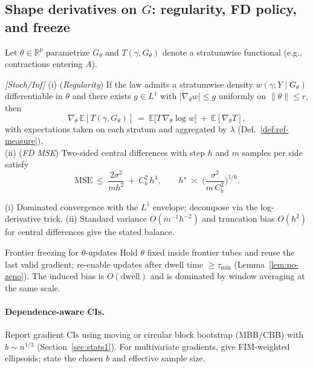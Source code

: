 \subsection{Shape derivatives on $G$: regularity, FD policy, and freeze}\label{subsec:shape}

Let $\theta\in\mathbb R^p$ parametrize $G_\theta$ and $T(\gamma,G_\theta)$ denote a stratumwise functional (e.g., contractions entering $A$).

\begin{proposition}\label{prop:score-fd-7}
\emph{[\textup{Stoch/Inf}]}
(i) (\emph{Regularity}) If the law admits a stratumwise density $w(\gamma;Y\!\mid G_\theta)$ differentiable in $\theta$ and there exists $g\in L^1$ with $|\nabla_\theta w|\le g$ uniformly on $\|\theta\|\le r$, then
\[
\nabla_\theta\,\mathbb E[T(\gamma,G_\theta)]
\ =\ \mathbb E\big[T\,\nabla_\theta\log w\big]\ +\ \mathbb E[\nabla_\theta T],
\]
with expectations taken on each stratum and aggregated by $\lambda$ (Def.~\ref{def:ref-measure}).\\
(ii) (\emph{FD MSE}) Two-sided central differences with step $h$ and $m$ samples per side satisfy
\[
\mathrm{MSE}\ \le\ \frac{2\sigma^2}{m h^2}\ +\ C_b^2\,h^4,\qquad 
h^\star\ \asymp\ \Big(\frac{\sigma^2}{m\,C_b^2}\Big)^{\!1/6}.
\]
\begin{proofsketch}
(i) Dominated convergence with the $L^1$ envelope; decompose via the log-derivative trick. (ii) Standard variance $O(m^{-1}h^{-2})$ and truncation bias $O(h^2)$ for central differences give the stated balance.
\end{proofsketch}
\end{proposition}

\begin{rulex}{Frontier freezing for $\theta$-updates}
Hold $\theta$ fixed inside frontier tubes and reuse the last valid gradient; re-enable updates after dwell time $\ge \tau_{\min}$ (Lemma~\ref{lem:no-zeno}). The induced bias is $O(\text{dwell})$ and is dominated by window averaging at the same scale.
\end{rulex}

\paragraph{Dependence-aware CIs.}
Report gradient CIs using moving or circular block bootstrap (MBB/CBB) with $b\sim n^{1/3}$ (Section~\ref{sec:stats1}). For multivariate gradients, give FIM-weighted ellipsoids; state the chosen $b$ and effective sample size.


